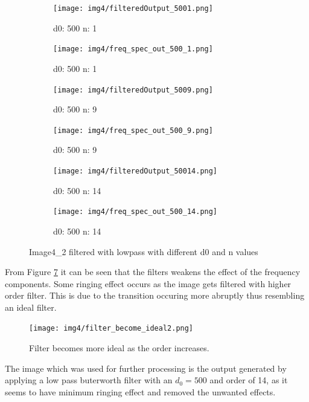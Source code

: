 \begin{figure}[H]
    
      \begin{subfigure}[b]{0.16\textwidth}
        \texttt{[image: img4/filteredOutput\_5001.png]}
        \caption{d0: 500 n: 1}
        \label{fig:img4_5001_im}
    \end{subfigure}
    \begin{subfigure}[b]{0.16\textwidth}
        \texttt{[image: img4/freq\_spec\_out\_500\_1.png]}
        \caption{d0: 500 n: 1}
        \label{fig:img4_5001_fr}
    \end{subfigure}
	 \begin{subfigure}[b]{0.16\textwidth}
        \texttt{[image: img4/filteredOutput\_5009.png]}
        \caption{d0: 500 n: 9}
        \label{fig:img4_5009_im}
    \end{subfigure}
    \begin{subfigure}[b]{0.16\textwidth}
        \texttt{[image: img4/freq\_spec\_out\_500\_9.png]}
        \caption{d0: 500 n: 9}
        \label{fig:img4_5009_fr}
    \end{subfigure}	
\begin{subfigure}[b]{0.16\textwidth}
        \texttt{[image: img4/filteredOutput\_50014.png]}
        \caption{d0: 500 n: 14}
        \label{fig:img4_50014_im}
    \end{subfigure}
    \begin{subfigure}[b]{0.16\textwidth}
        \texttt{[image: img4/freq\_spec\_out\_500\_14.png]}
        \caption{d0: 500 n: 14}
        \label{fig:img4_50014_fr}
    \end{subfigure}
 	\caption{Image4\_2 filtered with lowpass with different d0 and n values}
 	\label{fig:lowpass_all}
\end{figure}

From Figure \ref{fig:lowpass_all} it can be seen that the filters weakens the effect of the frequency components. Some ringing effect occurs as the image gets filtered with higher order filter. This is due to the transition occuring more abruptly thus resembling an ideal filter. 

\begin{figure}[H]
	\centering
	\texttt{[image: img4/filter\_become\_ideal2.png]}
	\caption{Filter becomes more ideal as the order increases.}
    \label{fig:filter_become_ideal}
\end{figure}


The image which was used for further processing is the output generated by applying a low pass buterworth filter with an $d_0 = 500$ and order of 14, as it seems to have minimum ringing effect and removed the unwanted effects. \\
 

